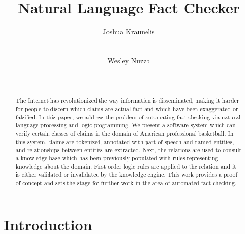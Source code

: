 \documentclass{chi2009}
\begin{document}
\setlength{\paperheight}{11in}
\setlength{\paperwidth}{8.5in}
\setlength{\pdfpageheight}{\paperheight}
\setlength{\pdfpagewidth}{\paperwidth}


\title{Natural Language Fact Checker}
\author{
  \alignauthor Joshua Kraunelis\\
    \\
    \\
  \alignauthor Wesley Nuzzo\\
    \\
    \\
}

\maketitle

\begin{abstract}
The Internet has revolutionized the way information is disseminated, making it harder for people to discern which claims are actual fact and which have been exaggerated or falsified.  In this paper, we address the problem of automating fact-checking via natural language processing and logic programming.  We present a software system which can verify certain classes of claims in the domain of American professional basketball.  In this system, claims are tokenized, annotated with part-of-speech and named-entities, and relationships between entities are extracted.  Next, the relations are used to consult a knowledge base which has been previously populated with rules representing knowledge about the domain. First order logic rules are applied to the relation and it is either validated or invalidated by the knowledge engine.  This work provides a proof of concept and sets the stage for further work in the area of automated fact checking.
\end{abstract}


\section{Introduction}
\end{document}
